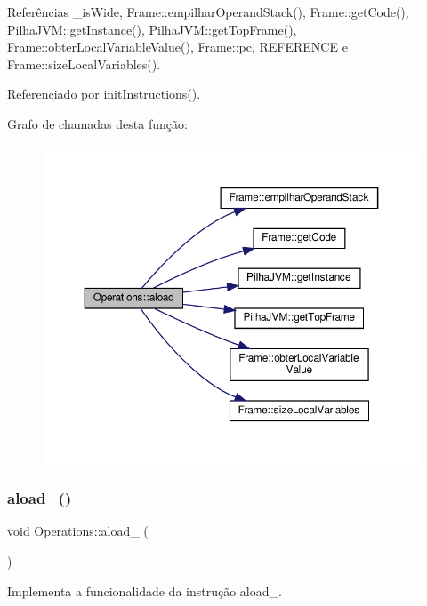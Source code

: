 Referências \+\_\+is\+Wide, Frame\+::empilhar\+Operand\+Stack(), Frame\+::get\+Code(), Pilha\+J\+V\+M\+::get\+Instance(), Pilha\+J\+V\+M\+::get\+Top\+Frame(), Frame\+::obter\+Local\+Variable\+Value(), Frame\+::pc, R\+E\+F\+E\+R\+E\+N\+CE e Frame\+::size\+Local\+Variables().



Referenciado por init\+Instructions().

Grafo de chamadas desta função\+:
\nopagebreak
\begin{figure}[H]
\begin{center}
\leavevmode
\includegraphics[width=350pt]{classOperations_a2f5c13146658e71de665c3b32ebed8c9_cgraph}
\end{center}
\end{figure}
\mbox{\label{classOperations_a9d821a16ef0681755717e8c4f740f6d0}} 
\subsubsection{\texorpdfstring{aload\+\_()}{aload\_0()}}
{\footnotesize\ttfamily void Operations\+::aload\+\_ (\begin{DoxyParamCaption}{ }\end{DoxyParamCaption})\hspace{0.3cm}{\ttfamily [private]}}



Implementa a funcionalidade da instrução aload\+\_. 



